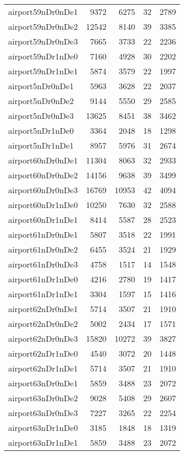 \begin{longtable}{lrrrr}
airport59nDr0nDe1 & 9372 & 6275 & 32 & 2789 \\
airport59nDr0nDe2 & 12542 & 8140 & 39 & 3385 \\
airport59nDr0nDe3 & 7665 & 3733 & 22 & 2236 \\
airport59nDr1nDe0 & 7160 & 4928 & 30 & 2202 \\
airport59nDr1nDe1 & 5874 & 3579 & 22 & 1997 \\
airport5nDr0nDe1 & 5963 & 3628 & 22 & 2037 \\
airport5nDr0nDe2 & 9144 & 5550 & 29 & 2585 \\
airport5nDr0nDe3 & 13625 & 8451 & 38 & 3462 \\
airport5nDr1nDe0 & 3364 & 2048 & 18 & 1298 \\
airport5nDr1nDe1 & 8957 & 5976 & 31 & 2674 \\
airport60nDr0nDe1 & 11304 & 8063 & 32 & 2933 \\
airport60nDr0nDe2 & 14156 & 9638 & 39 & 3499 \\
airport60nDr0nDe3 & 16769 & 10953 & 42 & 4094 \\
airport60nDr1nDe0 & 10250 & 7630 & 32 & 2588 \\
airport60nDr1nDe1 & 8414 & 5587 & 28 & 2523 \\
airport61nDr0nDe1 & 5807 & 3518 & 22 & 1991 \\
airport61nDr0nDe2 & 6455 & 3524 & 21 & 1929 \\
airport61nDr0nDe3 & 4758 & 1517 & 14 & 1548 \\
airport61nDr1nDe0 & 4216 & 2780 & 19 & 1417 \\
airport61nDr1nDe1 & 3304 & 1597 & 15 & 1416 \\
airport62nDr0nDe1 & 5714 & 3507 & 21 & 1910 \\
airport62nDr0nDe2 & 5002 & 2434 & 17 & 1571 \\
airport62nDr0nDe3 & 15820 & 10272 & 39 & 3827 \\
airport62nDr1nDe0 & 4540 & 3072 & 20 & 1448 \\
airport62nDr1nDe1 & 5714 & 3507 & 21 & 1910 \\
airport63nDr0nDe1 & 5859 & 3488 & 23 & 2072 \\
airport63nDr0nDe2 & 9028 & 5408 & 29 & 2607 \\
airport63nDr0nDe3 & 7227 & 3265 & 22 & 2254 \\
airport63nDr1nDe0 & 3185 & 1848 & 18 & 1319 \\
airport63nDr1nDe1 & 5859 & 3488 & 23 & 2072 \\

\end{longtable}
